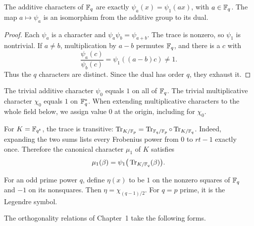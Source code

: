 
\begin{prop}
\label{prop-characters-any-additives}
The additive characters of $\mathbb{F}_q$ are exactly
$\psi_a(x)=\psi_1(ax)$, with $a\in\mathbb{F}_q$. The map $a\mapsto\psi_a$ is an
isomorphism from the additive group to its dual.
\end{prop}
\begin{proof}
Each $\psi_a$ is a character and $\psi_a\psi_b=\psi_{a+b}$.
The trace is nonzero, so $\psi_1$ is nontrivial. If $a\neq b$, multiplication
by $a-b$ permutes $\mathbb{F}_q$, and there is a $c$ with
\[
 \frac{\psi_a(c)}{\psi_b(c)}=\psi_1((a-b)c)\neq1.
\]
Thus the $q$ characters are distinct. Since the dual has order $q$, they
exhaust it.
\end{proof}


\begin{rem}
The trivial additive character $\psi_0$ equals $1$ on all of $\mathbb{F}_q$.
The trivial multiplicative character $\chi_0$ equals $1$ on $\mathbb{F}_q^*$.
When extending multiplicative characters to the whole field below, we assign
value $0$ at the origin, including for $\chi_0$.
\end{rem}


\begin{rem}
For $K=\mathbb{F}_{q^t}$, the trace is transitive:
$\operatorname{Tr}_{K/\mathbb{F}_p}=\operatorname{Tr}_{\mathbb{F}_q/\mathbb{F}_p}\circ\operatorname{Tr}_{K/\mathbb{F}_q}$.
Indeed, expanding the two sums lists every Frobenius power from $0$ to
$rt-1$ exactly once. Therefore the canonical character $\mu_1$ of $K$ satisfies
\begin{equation}
\label{eq-formula-extension-canonical-car}
 \mu_1(\beta)=\psi_1\big(\operatorname{Tr}_{K/\mathbb{F}_q}(\beta)\big).
\end{equation}
\end{rem}


\begin{exmp}
\label{notation-28}
For an odd prime power $q$, define $\eta(x)$ to be $1$ on the nonzero squares
of $\mathbb{F}_q$ and $-1$ on its nonsquares. Then
$\eta=\chi_{(q-1)/2}$. For $q=p$ prime, it is the Legendre symbol.
\end{exmp}
The orthogonality relations of Chapter~1 take the following forms.

